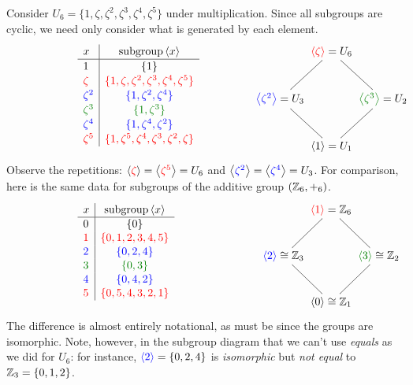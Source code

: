 \begin{example}{}{}
Consider $U_6=\{1,\zeta,\zeta^2,\zeta^3,\zeta^4,\zeta^5\}$ under multiplication. Since all subgroups are cyclic, we need only consider what is generated by each element.
\[\makebox[230pt][l]{$\def\arraystretch{1.1}\begin{array}[t]{l|c}
	x & \text{subgroup}\ip x\\ \hline
	1 & \{1 \} \\
	\textcolor{red}{\zeta} & \textcolor{red}{\{1,\zeta,\zeta^2,\zeta^3,\zeta^4,\zeta^5\}}\\
	\textcolor{blue}{\zeta^2} & \textcolor{blue}{\{1,\zeta^2,\zeta^4\}}\\
	\textcolor{Green}{\zeta^3} & \textcolor{Green}{\{1,\zeta^3\}}\\
	\textcolor{blue}{\zeta^4} & \textcolor{blue}{\{1,\zeta^4,\zeta^2\}}\\
	\textcolor{red}{\zeta^5} & \textcolor{red}{\{1,\zeta^5,\zeta^4,\zeta^3,\zeta^2,\zeta\}}
\end{array}$}
\makebox[0pt][c]{$\xymatrix @C0pt @R26pt{
& \textcolor{red}{\ip{\zeta}}=U_6 \ar@{-}[dl] \ar@{-}[dr] & \\
\textcolor{blue}{\ip{\zeta^2}}=U_3 \ar@{-}[dr] & & \textcolor{Green}{\ip{\zeta^3}}=U_2 \ar@{-}[dl] \\
& \ip{1}=U_1 &
}$}\]
Observe the repetitions: $\left\langle \textcolor{red}{\zeta}\right\rangle=\left\langle \textcolor{red}{\zeta^5}\right\rangle=U_6$ and $\left\langle \textcolor{blue}{\zeta^2}\right\rangle=\left\langle \textcolor{blue}{\zeta^4}\right\rangle=U_3$.
\medbreak
For comparison, here is the same data for subgroups of the additive group $(\mathbb{Z}_6,+_6)$.
\[\makebox[230pt][l]{$\def\arraystretch{1.05}\begin{array}[t]{l|c}
	x & \text{subgroup}\ip x\\ \hline
	0 & \{0\} \\
	\textcolor{red}{1} & \textcolor{red}{\{0,1,2,3,4,5\}}\\
	\textcolor{blue}{2} & \textcolor{blue}{\{0,2,4\}}\\
	\textcolor{Green}{3} & \textcolor{Green}{\{0,3\}}\\
	\textcolor{blue}{4} & \textcolor{blue}{\{0,4,2\}}\\
	\textcolor{red}{5} & \textcolor{red}{\{0,5,4,3,2,1\}}
\end{array}$}
\makebox[0pt][c]{$\xymatrix @C0pt @R26pt{	
& \textcolor{red}{\ip{1}}=\Z_6 \ar@{-}[dl] \ar@{-}[dr] & \\
\textcolor{blue}{\ip{2}}\cong\Z_3 \ar@{-}[dr] & & \textcolor{Green}{\ip{3}}\cong\Z_2 \ar@{-}[dl] \\
& \ip{0}\cong\Z_1 &
}$}\]
The difference is almost entirely notational, as must be since the groups are isomorphic. Note, however, in the subgroup diagram that we can't use \emph{equals} as we did for $U_6$: for instance, $\textcolor{blue}{\left\langle 2\right\rangle}=\{0,2,4\}$ is \emph{isomorphic} but \emph{not equal} to $\mathbb{Z}_3=\{0,1,2\}$.
\end{example}

